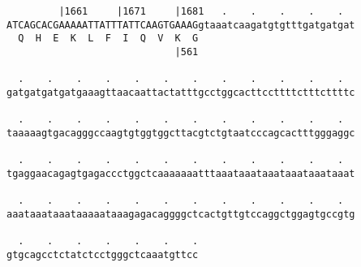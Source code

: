 \documentclass{article}
\begin{document}
\begin{Verbatim}
         |1661     |1671     |1681   .    .    .    .    .  
ATCAGCACGAAAAATTATTTATTCAAGTGAAAGgtaaatcaagatgtgtttgatgatgat
  Q  H  E  K  L  F  I  Q  V  K  G                           
                             |561                           
  
  .    .    .    .    .    .    .    .    .    .    .    .  
gatgatgatgatgaaagttaacaattactatttgcctggcacttccttttctttcttttc
  
  .    .    .    .    .    .    .    .    .    .    .    .  
taaaaagtgacagggccaagtgtggtggcttacgtctgtaatcccagcactttgggaggc
  
  .    .    .    .    .    .    .    .    .    .    .    .  
tgaggaacagagtgagaccctggctcaaaaaaatttaaataaataaataaataaataaat
  
  .    .    .    .    .    .    .    .    .    .    .    .  
aaataaataaataaaaataaagagacaggggctcactgttgtccaggctggagtgccgtg
  
  .    .    .    .    .    .    .
gtgcagcctctatctcctgggctcaaatgttcc
\end{Verbatim}
\newpage
\end{document}
